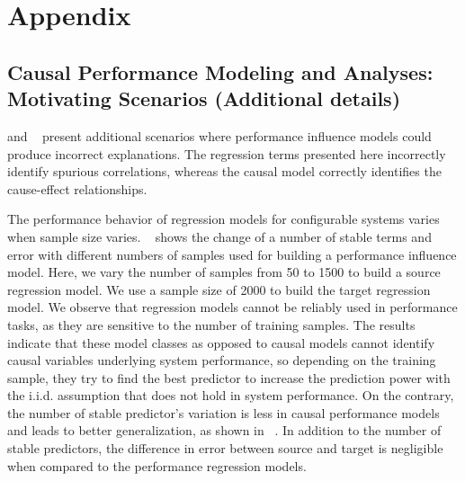 \section{Appendix}
\label{sec:appendix}
\subsection{Causal Performance Modeling and Analyses: Motivating Scenarios (Additional details)}




 and ~ present additional scenarios where performance influence models could produce incorrect explanations. The regression terms presented here incorrectly identify spurious correlations, whereas the causal model correctly identifies the cause-effect relationships. 



The performance behavior of regression models for configurable systems varies when sample size varies. ~ shows the change of a number of stable terms and error with different numbers of samples used for building a performance influence model. Here, we vary the number of samples from 50 to 1500 to build a source regression model. We use a sample size of 2000 to build the target regression model. We observe that regression models cannot be reliably used in performance tasks, as they are sensitive to the number of training samples. The results indicate that these model classes as opposed to causal models cannot identify causal variables underlying system performance, so depending on the training sample, they try to find the best predictor to increase the prediction power with the i.i.d. assumption that does not hold in system performance. On the contrary, the number of stable predictor's variation is less in causal performance models and leads to better generalization, as shown in ~. In addition to the number of stable predictors, the difference in error between source and target is negligible when compared to the performance regression models. 

